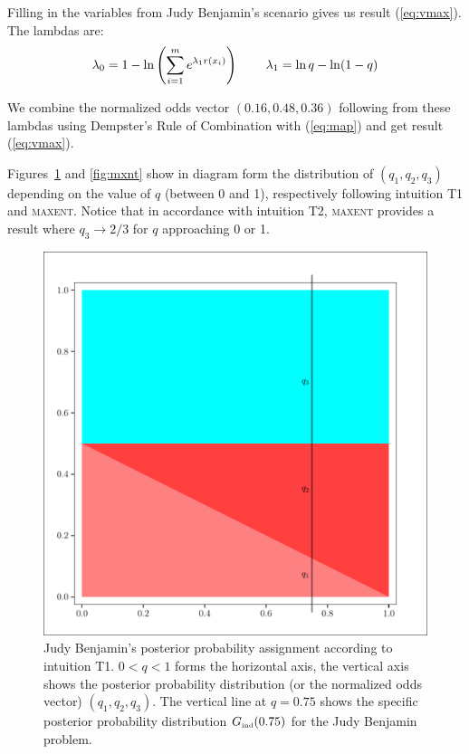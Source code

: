 \documentclass[12pt]{article}
\def\lwv{.6}
\begin{document}
Filling in the variables from Judy Benjamin's scenario gives us result
({\ref{eq:vmax}}). The lambdas are:
  \begin{displaymath}
    \lambda_{0}=1-\ln\left(\sum_{i=1}^{m}e^{\lambda_{1}r(x_{i})}\right)\hspace{.3in}
    \lambda_{1}=\ln{}q-\ln(1-q)\notag
  \end{displaymath}

  We combine the normalized odds vector $(0.16,0.48,0.36)$ following
  from these lambdas using Dempster's Rule of Combination with
  ({\ref{eq:map}}) and get result ({\ref{eq:vmax}}).

Figures~\ref{fig:unif} and \ref{fig:mxnt} show in diagram form the
distribution of $(q_{1},q_{2},q_{3})$ depending on the value of $q$
(between 0 and 1), respectively following intuition T1 and
\textsc{maxent}. Notice that in accordance with intuition T2,
\textsc{maxent} provides a result where $q_{3}\rightarrow{}2/3$ for
$q$ approaching 0 or 1.

\begin{figure}[h]
  \begin{flushright}
    \begin{minipage}[h]{\lwv\linewidth}
      \includegraphics[width=\textwidth]{zeroone-unif.pdf}
      \caption{Judy Benjamin's posterior probability assignment
        according to intuition T1. $0<q<1$ forms the horizontal axis,
        the vertical axis shows the posterior probability distribution
        (or the normalized odds vector) $(q_{1},q_{2},q_{3})$. The
        vertical line at $q=0.75$ shows the specific posterior
        probability distribution $G_{\mbox{\tiny ind}}(0.75)$ for the Judy
        Benjamin problem.}
      \label{fig:unif}
    \end{minipage}
  \end{flushright}
\end{figure}
\end{document}
